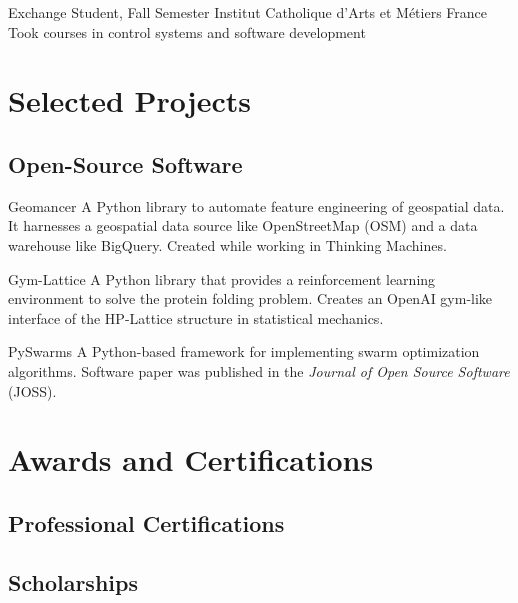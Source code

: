 \documentclass[12pt,a4paper]{moderncv}
\begin{document}
{Exchange Student, Fall Semester}
{Institut Catholique d'Arts et M\'etiers}
{France}{}
{Took courses in control systems and software development}

\section{Selected Projects}

\subsection{Open-Source Software}


{\color{blue}
    }
{Geomancer}{}{}
{
    A Python library to automate feature engineering of geospatial data. It
    harnesses a geospatial data source like OpenStreetMap (OSM) and a data
    warehouse like BigQuery. Created while working in Thinking Machines.
}

{\color{blue} }
{Gym-Lattice}{}{}
{
    A Python library that provides a reinforcement learning environment
    to solve the protein folding problem. Creates an OpenAI gym-like
    interface of the HP-Lattice structure in statistical mechanics.
}

{\color{blue} }
{PySwarms}{}{}
{
    A Python-based framework for implementing swarm optimization
    algorithms. Software paper was published in the \textit{Journal of Open
        Source Software} (JOSS).
}


\section{Awards and Certifications}

\subsection{Professional Certifications}

\subsection{Scholarships}


\nocite{*}


\end{document}
